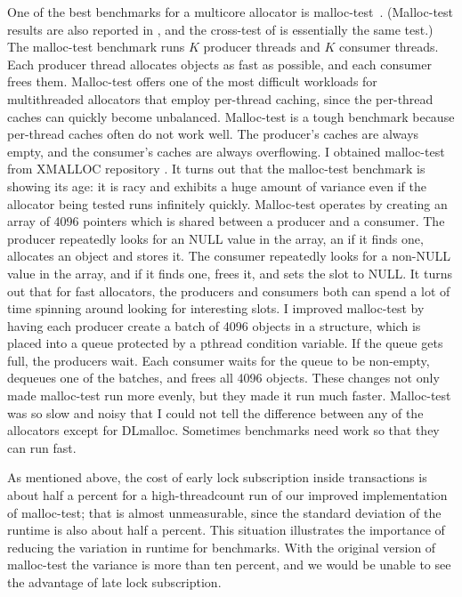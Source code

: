\documentclass[natbib,sort&compress]{sigplanconf}
\begin{document}
One of the best benchmarks for a multicore allocator is
malloc-test~\cite{LeverBo00}.  (Malloc-test results are also reported
in \cite{Evans06}, and the cross-test of \cite{KukanovVo07} is
essentially the same test.)  The malloc-test benchmark runs $K$
producer threads and $K$ consumer threads.  Each producer thread
allocates objects as fast as possible, and each consumer frees them.
Malloc-test offers one of the most difficult workloads for
multithreaded allocators that employ per-thread caching, since the
per-thread caches can quickly become unbalanced.  Malloc-test is a
tough benchmark because per-thread caches often do not work well.  The
producer's caches are always empty, and the consumer's caches are
always overflowing.  I obtained malloc-test from XMALLOC repository
\cite{EderSc12}.  It turns out that the malloc-test benchmark is
showing its age: it is racy and exhibits a huge amount of variance
even if the allocator being tested runs infinitely quickly.
Malloc-test operates by creating an array of 4096 pointers which is
shared between a producer and a consumer.  The producer repeatedly
looks for an NULL value in the array, an if it finds one, allocates an
object and stores it.  The consumer repeatedly looks for a non-NULL
value in the array, and if it finds one, frees it, and sets the slot
to NULL\@.  It turns out that for fast allocators, the producers and
consumers both can spend a lot of time spinning around looking for
interesting slots.  I improved malloc-test by having each producer
create a batch of 4096 objects in a structure, which is placed into a
queue protected by a pthread condition variable.  If the queue gets
full, the producers wait.  Each consumer waits for the queue to be
non-empty, dequeues one of the batches, and frees all 4096 objects.
These changes not only made malloc-test run more evenly, but they made
it run much faster.  Malloc-test was so slow and noisy that I could
not tell the difference between any of the allocators except for
DLmalloc.  Sometimes benchmarks need work so that they can run fast.

As mentioned above, the cost of early lock subscription inside
transactions is about half a percent for a high-threadcount run of our
improved implementation of malloc-test; that is almost unmeasurable,
since the standard deviation of the runtime is also about half a
percent.  This situation illustrates the importance of reducing the
variation in runtime for benchmarks.  With the original version of
malloc-test the variance is more than ten percent, and we would be
unable to see the advantage of late lock subscription.
\end{document}

